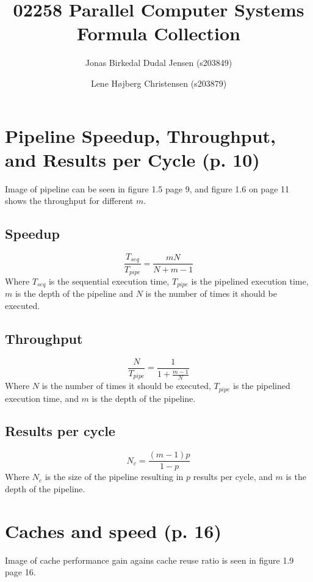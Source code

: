 \documentclass{article}
\title{02258 Parallel Computer Systems Formula Collection}
\author{Jonas Birkedal Dudal Jensen (s203849) \and Lene Højberg Christensen (s203879)}
\date{}
\begin{document}
	\maketitle
	\newpage

	\tableofcontents
	\newpage

	\section{Pipeline Speedup, Throughput, and Results per Cycle (p. 10)}
		Image of pipeline can be seen in figure 1.5 page 9, and figure 1.6 on page 11 shows the throughput for different $m$.

		\subsection{Speedup}
		\begin{equation}
			\frac{T_{seq}}{T_{pipe}}=\frac{mN}{N+m-1}
		\end{equation}
		Where $T_{seq}$ is the sequential execution time, $T_{pipe}$ is the pipelined execution time, $m$ is the depth of the pipeline and $N$ is the number of times it should be executed.

		\subsection{Throughput}
		\begin{equation}
			\frac{N}{T_{pipe}}=\frac{1}{1+\frac{m-1}{N}}
		\end{equation}
		Where $N$ is the number of times it should be executed, $T_{pipe}$ is the pipelined execution time, and $m$ is the depth of the pipeline.

		\subsection{Results per cycle}
		\begin{equation}
			N_c=\frac{(m-1)p}{1-p}
		\end{equation}
		Where $N_c$ is the size of the pipeline resulting in $p$ results per cycle, and $m$ is the depth of the pipeline.
	
	\section{Caches and speed (p. 16)}
		Image of cache performance gain agains cache reuse ratio is seen in figure 1.9 page 16.
\end{document}
